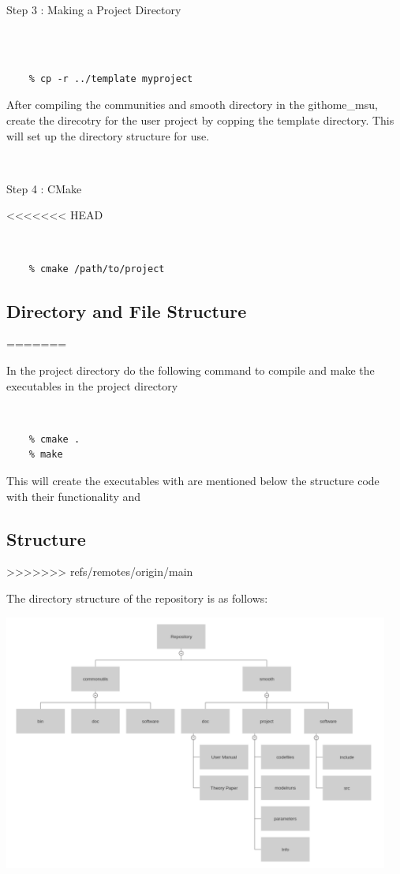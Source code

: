 \documentclass[12pt]{article}
\numberwithin{equation}{section}
\numberwithin{figure}{section}
\begin{document}
\begin{description}
\item[Step 3 : Making a Project Directory] 
\end{description}
{\tt 
\begin{verbatim}

    % cp -r ../template myproject
\end{verbatim}
}
After compiling the communities and smooth directory in the githome\_msu, create the direcotry for the user project by copping the template directory. 
This will set up the directory structure for use. 

\\ 

\begin{description}
\item[Step 4 : CMake]
\end{description}
<<<<<<< HEAD
\vspace{-20pt}
{\tt 
\begin{verbatim}
    % cmake /path/to/project
\end{verbatim}
}

\subsection{Directory and File Structure}
=======

In the project directory do the following command to compile and make the executables in the project directory  

{\tt 
\begin{verbatim}
    % cmake . 
    % make  
\end{verbatim}
}

This will create the executables with are mentioned below the structure code with their functionality and 

\subsection{Structure}
>>>>>>> refs/remotes/origin/main

The directory structure of the repository is as follows: 

\centerline{\includegraphics[width = 0.95\textwidth]{Structure_Tree.png}}
\end{document}
